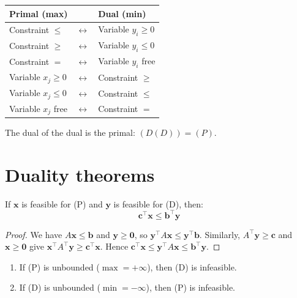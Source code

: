 \begin{keyformulas}[title=\textbf{Dual construction rules}]
\begin{center}
\renewcommand{\arraystretch}{1.3}
\begin{tabular}{lll}
  \toprule
  \textbf{Primal (max)} & & \textbf{Dual (min)} \\
  \midrule
  Constraint $\le$ & $\leftrightarrow$ & Variable $y_i \ge 0$ \\
  Constraint $\ge$ & $\leftrightarrow$ & Variable $y_i \le 0$ \\
  Constraint $=$ & $\leftrightarrow$ & Variable $y_i$ free \\
  Variable $x_j \ge 0$ & $\leftrightarrow$ & Constraint $\ge$ \\
  Variable $x_j \le 0$ & $\leftrightarrow$ & Constraint $\le$ \\
  Variable $x_j$ free & $\leftrightarrow$ & Constraint $=$ \\
  \bottomrule
\end{tabular}
\end{center}
\end{keyformulas}

\begin{remark}
The dual of the dual is the primal: $(D(D)) = (P)$.
\end{remark}

\section{Duality theorems}

\begin{theorem}
\label{thm:weak_duality}
If $\mathbf{x}$ is feasible for (P) and $\mathbf{y}$ is feasible for (D),
then:
\[
  \mathbf{c}^\top \mathbf{x} \le \mathbf{b}^\top \mathbf{y}
\]
\end{theorem}

\begin{proof}
We have $A\mathbf{x} \le \mathbf{b}$ and $\mathbf{y} \ge \mathbf{0}$, so
$\mathbf{y}^\top A\mathbf{x} \le \mathbf{y}^\top \mathbf{b}$.  Similarly,
$A^\top\mathbf{y} \ge \mathbf{c}$ and $\mathbf{x} \ge \mathbf{0}$ give
$\mathbf{x}^\top A^\top\mathbf{y} \ge \mathbf{c}^\top\mathbf{x}$.  Hence
$\mathbf{c}^\top\mathbf{x} \le \mathbf{y}^\top A\mathbf{x} \le
\mathbf{b}^\top\mathbf{y}$.
\end{proof}

\begin{corollary}[Bounds]
\begin{enumerate}
  \item If (P) is unbounded ($\max = +\infty$), then (D) is infeasible.
  \item If (D) is unbounded ($\min = -\infty$), then (P) is infeasible.
\end{enumerate}
\end{corollary}

